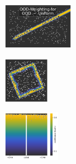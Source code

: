 \begin{figure}[H]
    \centering
    \begin{subfigure}
        \centering
        \includegraphics[width=0.388\textwidth,valign=t]{ood-detection/figures/ood-synthesis/ood-line-uniform-weighted.pdf}
    \end{subfigure}
    \begin{subfigure}
        \centering
        \includegraphics[width=0.254\textwidth,valign=t]{ood-detection/figures/ood-synthesis/ood-circle-uniform-weighted.pdf}
    \end{subfigure}
    \begin{subfigure}
        \centering
        \includegraphics[width=0.308\textwidth,valign=t]{ood-detection/figures/ood-synthesis/ood-haystack-uniform-weighted.pdf}
    \end{subfigure}


\end{figure}
